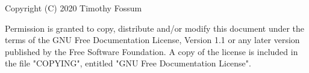 \begin{minipage}[t]{\sw}
\LARGE
\vspace*{1in}
Copyright (C) 2020 Timothy Fossum\exx

Permission is granted to copy, distribute and/or modify this document
under the terms of the GNU Free Documentation License, Version 1.1
or any later version published by the Free Software Foundation.
A copy of the license is included in the file "COPYING", entitled "GNU
Free Documentation License".

\end{minipage}
\clearpage
